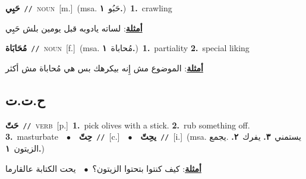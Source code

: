 \documentclass[10pt,a4paper,twoside]{article} %
\begin{document}
\begin{multicols}{2}
{\setlength\topsep{0pt}\textbf{\foreignlanguage{arabic}{حَبِي}}\ {\color{gray}\texttt{//}\color{black}}\ \textsc{noun}\ [m.]\ \color{gray}(msa. \foreignlanguage{arabic}{حَبُو}~\foreignlanguage{arabic}{\textbf{١.}})\color{black}\ \textbf{1.}~crawling\  \begin{flushright}\color{gray}\foreignlanguage{arabic}{\textbf{\underline{\foreignlanguage{arabic}{أمثلة}}}: لساته يادوبه قبل يومين بلش حَبِي}\end{flushright}\color{black}} \vspace{2mm}

{\setlength\topsep{0pt}\textbf{\foreignlanguage{arabic}{مُحَابَاة}}\ {\color{gray}\texttt{//}\color{black}}\ \textsc{noun}\ [f.]\ \color{gray}(msa. \foreignlanguage{arabic}{مُحاباة}~\foreignlanguage{arabic}{\textbf{١.}})\color{black}\ \textbf{1.}~partiality  \textbf{2.}~special liking\  \begin{flushright}\color{gray}\foreignlanguage{arabic}{\textbf{\underline{\foreignlanguage{arabic}{أمثلة}}}: الموضوع مش إِنه بيكرهك بس هي مُحاباة مش أكثر}\end{flushright}\color{black}} \vspace{2mm}

\vspace{-3mm}
\subsection*{\color{blue}\foreignlanguage{arabic}{ح.ت.ت}\color{blue}{}} 

{\setlength\topsep{0pt}\textbf{\foreignlanguage{arabic}{حَتّ}}\ {\color{gray}\texttt{//}\color{black}}\ \textsc{verb}\ [p.]\ \textbf{1.}~pick olives with a stick.  \textbf{2.}~rub something off.  \textbf{3.}~masturbate\ \ $\bullet$\ \ \setlength\topsep{0pt}\textbf{\foreignlanguage{arabic}{حِتّ}}\ {\color{gray}\texttt{//}\color{black}}\ [c.]\ \ $\bullet$\ \ \setlength\topsep{0pt}\textbf{\foreignlanguage{arabic}{يحِتّ}}\ {\color{gray}\texttt{//}\color{black}}\ [i.]\ \color{gray}(msa. \foreignlanguage{arabic}{يستمني}~\foreignlanguage{arabic}{\textbf{٣.}}  \foreignlanguage{arabic}{يفرك}~\foreignlanguage{arabic}{\textbf{٢.}}  .\foreignlanguage{arabic}{يجمع الزيتون}~\foreignlanguage{arabic}{\textbf{١.}})\color{black}\  \begin{flushright}\color{gray}\foreignlanguage{arabic}{\textbf{\underline{\foreignlanguage{arabic}{أمثلة}}}: كيف كنتوا بتحتوا الزيتون؟\ $\bullet$\ \  يحت الكتابة عالقارما}\end{flushright}\color{black}} \vspace{2mm}


\end{multicols}
\end{document}
